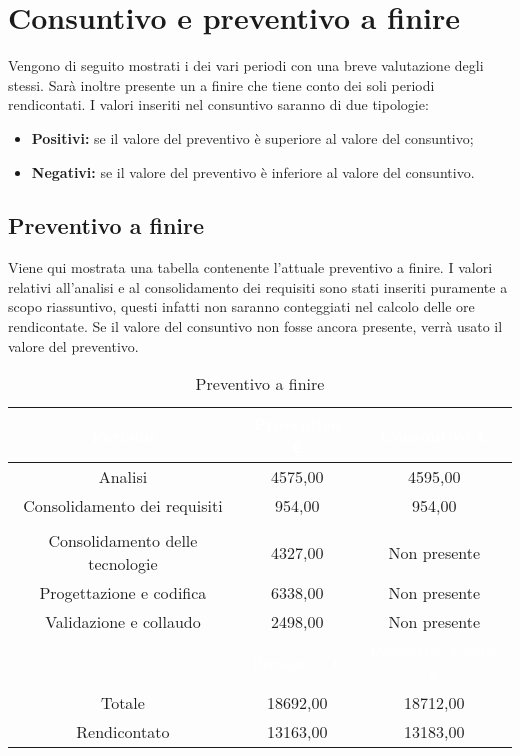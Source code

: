 \section{Consuntivo e preventivo a finire}
\label{consuntivo_preventivo_a_finire}
Vengono di seguito mostrati i  dei vari periodi con una breve valutazione degli stessi. Sarà inoltre presente un  a finire che tiene conto dei soli periodi rendicontati. I valori inseriti nel consuntivo saranno di due tipologie:
\begin {itemize}
	\item \textbf{Positivi:} se il valore del preventivo è superiore al valore del consuntivo;
	\item \textbf{Negativi:} se il valore del preventivo è inferiore al valore del consuntivo.
\end{itemize}


\subsection{Preventivo a finire}
Viene qui mostrata una tabella contenente l'attuale preventivo a finire. I valori relativi all'analisi e al consolidamento dei requisiti sono stati inseriti puramente a scopo riassuntivo, questi infatti non saranno conteggiati nel calcolo delle ore rendicontate. Se il valore del consuntivo non fosse ancora presente, verrà usato il valore del preventivo.
\begin{table}[H]
	\centering
	\begin{tabular}{|c|c|c|}
	\rowcolor{darkblue} 
		\textcolor{white}{Periodo}		&\textcolor{white}{Preventivo €}&	\textcolor{white}{Consuntivo €}\\ \hline
		Analisi							&	4575,00						&	4595,00 \\ \hline
		Consolidamento dei requisiti	&	954,00						&	954,00 \\ \hline
		\rowcolor{darkblue} \multicolumn{3}{|c|}{\textcolor{white}{Rendicontato}}\\ \hline
		Consolidamento delle tecnologie	&	4327,00						&	Non presente \\ \hline
		Progettazione e codifica		&	6338,00						&	Non presente \\ \hline
		Validazione e collaudo			&	2498,00						&	Non presente \\ \hline
		\rowcolor{darkblue}				&\textcolor{white}{Preventivo €}&	\textcolor{white}{Preventivo a finire €}\\ \hline
		Totale							&	18692,00					&	18712,00 \\ \hline
		Rendicontato					&	13163,00					&	13183,00 \\ \hline
	\end{tabular}
	\caption{Preventivo a finire}
\end{table}